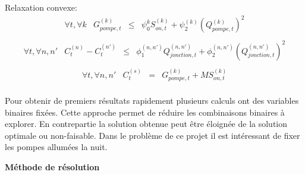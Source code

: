 \documentclass{article}
\begin{document}
Relaxation convexe:
\begin{equation}
    \tag{Gain charge pompe relax.}
    \left.
        \begin{array}{lccc}
            \forall t, \forall k   &   G_{pompe,t}^{(k)}     & \leq &   \psi_0^{k}S_{on,t}^{(k)} + \psi_2^{(k)}(Q_{pompe,t}^{(k)})^2\\[0.2cm]
        \end{array}
    \right.
\end{equation}
\begin{equation}
    \tag{Perte charge flux relax.}
    \left.
        \begin{array}{lcccc}
            \forall t, \forall n,n'   &   C_t^{(n)}  - C_t^{(n')}    & \leq &   \phi_1^{(n,n')}Q_{jonction,t}^{(n,n')} + \phi_2^{(n,n')}(Q_{jonction,t}^{(n,n')})^2\\[0.2cm]
        \end{array}
    \right.
\end{equation}
\begin{equation}
    \tag{Charge source relax.}
    \left.
        \begin{array}{lcccc}
            \forall t, \forall n,n'   &   C_t^{(s)} & = & G_{pompe,t}^{(k)} + M S_{on,t}^{(k)}\\[0.2cm]
        \end{array}
    \right.
\end{equation}
\begin{multicols}{2}
    Pour obtenir de premiers résultats rapidement plusieurs calculs ont des variables binaires fixées. Cette approche permet de réduire les combinaisons binaires à explorer. En contrepartie la solution obtenue peut être éloignée de la solution optimale ou non-faisable. Dans le problème de ce projet il est intéressant de fixer les pompes allumées la nuit.
\end{multicols}
\textbf{Méthode de résolution}\\
\end{document}
